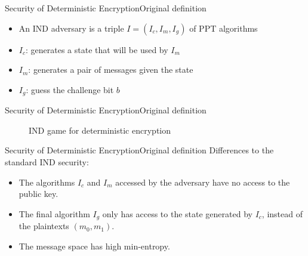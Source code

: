 \documentclass{beamer}
\begin{document}
\begin{frame}{Security of Deterministic Encryption}{Original definition}
\begin{itemize}
\item An IND adversary is a triple $I = (I_c, I_m, I_g)$ of PPT algorithms
\item $I_c$: generates a state that will be used by $I_m$
\item $I_m$: generates a pair of messages given the state
\item $I_g$: guess the challenge bit $b$
\end{itemize}
\end{frame}


\begin{frame}{Security of Deterministic Encryption}{Original definition}
\begin{figure}[H]
	\begin{pchstack}[center]
	\end{pchstack}
	
	\caption{IND game for deterministic encryption}
\end{figure}
\end{frame}


\begin{frame}{Security of Deterministic Encryption}{Original definition}
Differences to the standard IND security:
\begin{itemize}
	\item
	The algorithms $I_c$ and $I_m$ accessed by the adversary have no access to the public key.
	\item
	The final algorithm $I_g$ only has access to the state generated by $I_c$, instead of the plaintexts $(m_0, m_1)$.
	\item
	The message space has high min-entropy.
\end{itemize}
\end{frame}
\end{document}
